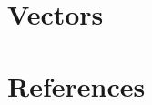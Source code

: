 \documentclass[
  letterpaper,
  DIV=11,
  numbers=noendperiod]{scrreprt}
\newlength{\cslhangindent}
\newlength{\cslentryspacingunit} %
\newenvironment{CSLReferences}[2] %
 {%
  \setlength{\parindent}{0pt}
  \ifodd #1
  \let\oldpar\par
  \def\par{\hangindent=\cslhangindent\oldpar}
  \fi
  \setlength{\parskip}{#2\cslentryspacingunit}
 }%
 {}
\begin{document}
\hypertarget{vectors}{%
\chapter{Vectors}\label{vectors}}


\hypertarget{references}{%
\chapter*{References}\label{references}}


\hypertarget{refs}{}
\begin{CSLReferences}{0}{0}
\end{CSLReferences}
\end{document}
